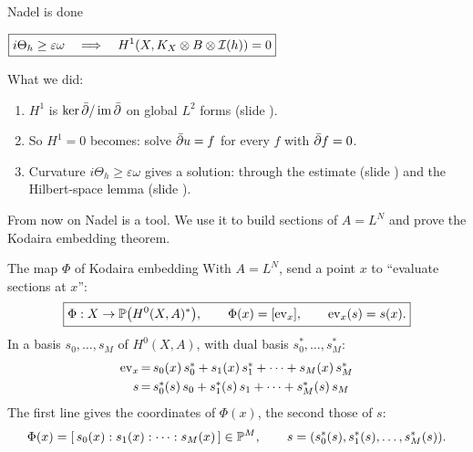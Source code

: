 \begin{frame}{Nadel is done}
\label{fr:nadel-done}
\begin{center}
\(\boxed{i\Theta_h\ge\varepsilon\omega\quad\Longrightarrow\quad H^1(X,K_X\otimes B\otimes\mathcal I(h))=0}\)
\end{center}
\par\medskip
What we did:
\begin{enumerate}
\setlength{\itemsep}{6pt}
\item \(H^1\) is \(\ker\bar\partial/\operatorname{im}\bar\partial\) on global \(L^2\) forms (slide \hyperlink{fr:l2-kernel}{\pageref{fr:l2-kernel}}).
\item So \(H^1=0\) becomes: solve \(\bar\partial u=f\) for every \(f\) with \(\bar\partial f=0\).
\item Curvature \(i\Theta_h\ge\varepsilon\omega\) gives a solution: through the estimate (slide \hyperlink{fr:nadel-estimate}{\pageref{fr:nadel-estimate}}) and the Hilbert-space lemma (slide \hyperlink{fr:hilbert-lemma}{\pageref{fr:hilbert-lemma}}).
\end{enumerate}
\par\medskip
From now on Nadel is a tool. We use it to build sections of \(A=L^N\) and prove the Kodaira embedding theorem.
\end{frame}

\begin{frame}{The map \(\Phi\) of Kodaira embedding}
\label{fr:need}
With \(A=L^N\), send a point \(x\) to ``evaluate sections at \(x\)'':
\[
\boxed{\Phi:X\to\mathbb P\bigl(H^0(X,A)^*\bigr),\qquad \Phi(x)=[\operatorname{ev}_x],\qquad \operatorname{ev}_x(s)=s(x).}
\]
In a basis \(s_0,\ldots,s_M\) of \(H^0(X,A)\), with dual basis \(s_0^*,\ldots,s_M^*\):
\[
\begin{array}{r@{\,=\,}l}
\operatorname{ev}_x & s_0(x)\,s_0^*+s_1(x)\,s_1^*+\cdots+s_M(x)\,s_M^*\\[3pt]
s & s_0^*(s)\,s_0+s_1^*(s)\,s_1+\cdots+s_M^*(s)\,s_M
\end{array}
\]
The first line gives the coordinates of \(\Phi(x)\), the second those of \(s\):
\[
\Phi(x)=[\,s_0(x):s_1(x):\cdots:s_M(x)\,]\in\mathbb P^M,\qquad s=(s_0^*(s),s_1^*(s),\ldots,s_M^*(s)).
\]
\end{frame}





